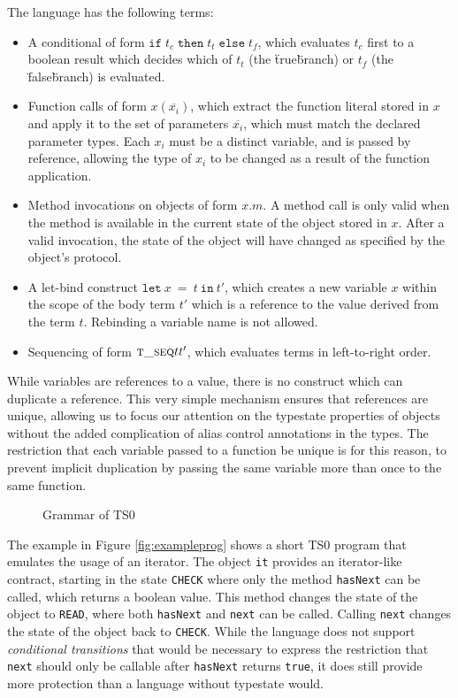 \documentclass[preprint]{sigplanconf}
\newcommand{\figref}[1]{Figure \ref{#1}}
\newcommand{\tseq}{\textsc{t\_seq} }
\newcommand{\lett}[3]{\mathtt{let}\:#1\:\mathtt{=}\:#2\:\mathtt{in}\:#3}
\newcommand{\ift}[3]{\mathtt{if} \; #1 \; \mathtt{then} \; #2 \; \mathtt{else} \; #3}
\begin{document}
\noindent
The language has the following terms:

\begin{itemize}
\item A conditional of form $\ift{t_c}{t_t}{t_f}$, which evaluates
$t_c$ first to a boolean result which decides which of $t_t$ 
(the \"true\" branch) or $t_f$ (the \"false\" branch) is
evaluated.
\item Function calls of form $x(\overline{x_i})$, which extract the function
literal stored in $x$ and apply it to the set of parameters $\overline{x_i}$,
which must match the declared parameter types. Each $x_i$ must be a distinct
variable, and is passed by reference, allowing the type of $x_i$ to be changed
as a result of the function application.
\item Method invocations on objects of form $x.m$. A method call is only
valid when the method is available in the current state of the object stored
in $x$. After a valid invocation, the state of the object will have changed
as specified by the object's protocol.
\item A let-bind construct $\lett{x}{t}{t'}$, which creates a new variable
$x$ within the scope of the body term $t'$ which is a reference to the value
derived from the term $t$. Rebinding a variable name is not allowed.
\item Sequencing of form $\tseq{t}{t'}$, which evaluates terms in 
left-to-right order.
\end{itemize}

While variables are references to a value, there is no construct which
can duplicate a reference. This very simple mechanism
ensures that references are unique, allowing us to focus our attention on the
typestate properties of objects without the added complication of alias
control annotations in the types. The restriction that each variable passed to
a function be unique is for this reason, to prevent implicit duplication
by passing the same variable more than once to the same function.

\begin{figure}

\ottgrammartabular{
\ottt\ottinterrule
\ottv\ottinterrule
\otto\ottinterrule
\ottT\ottinterrule
\ottO\ottinterrule
}

\caption{\label{fig:grammar} Grammar of TS0}
\end{figure}

The example in \figref{fig:exampleprog} shows a short TS0 program
that emulates the usage of an iterator. The object {\tt it}
provides an iterator-like contract, starting in the state {\tt CHECK} where
only the method {\tt hasNext} can be called, which returns a boolean value.
This method changes the state of the object to {\tt READ}, where both
{\tt hasNext} and {\tt next} can be called. Calling {\tt next} changes the
state of the object back to {\tt CHECK}. While the language does not
support {\it conditional transitions} that would be necessary to express
the restriction that {\tt next} should only be callable after {\tt hasNext}
returns {\tt true}, it does still provide more protection than a language
without typestate would.
\end{document}
